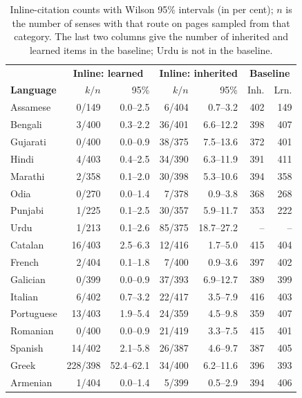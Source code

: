 \documentclass[11pt]{article}
\begin{document}
\begin{table}[h]
\centering\footnotesize
\setlength{\tabcolsep}{1.2pt}
\begin{tabular}{lrrrrrr}
\toprule
& \multicolumn{2}{c}{\textbf{Inline: learned}} & \multicolumn{2}{c}{\textbf{Inline: inherited}} & \multicolumn{2}{c}{\textbf{Baseline}} \\
\textbf{Language} & $k/n$ & 95\% & $k/n$ & 95\% & Inh. & Lrn. \\
\midrule
Assamese & 0/149 & 0.0--2.5 & 6/404 & 0.7--3.2 & 402 & 149 \\
Bengali & 3/400 & 0.3--2.2 & 36/401 & 6.6--12.2 & 398 & 407 \\
Gujarati & 0/400 & 0.0--0.9 & 38/375 & 7.5--13.6 & 372 & 401 \\
Hindi & 4/403 & 0.4--2.5 & 34/390 & 6.3--11.9 & 391 & 411 \\
Marathi & 2/358 & 0.1--2.0 & 30/398 & 5.3--10.6 & 394 & 358 \\
Odia & 0/270 & 0.0--1.4 & 7/378 & 0.9--3.8 & 368 & 268 \\
Punjabi & 1/225 & 0.1--2.5 & 30/357 & 5.9--11.7 & 353 & 222 \\
Urdu & 1/213 & 0.1--2.6 & 85/375 & 18.7--27.2 & -- & -- \\
\midrule
Catalan & 16/403 & 2.5--6.3 & 12/416 & 1.7--5.0 & 415 & 404 \\
French & 2/404 & 0.1--1.8 & 7/400 & 0.9--3.6 & 397 & 402 \\
Galician & 0/399 & 0.0--0.9 & 37/393 & 6.9--12.7 & 389 & 399 \\
Italian & 6/402 & 0.7--3.2 & 22/417 & 3.5--7.9 & 416 & 403 \\
Portuguese & 13/403 & 1.9--5.4 & 24/359 & 4.5--9.8 & 359 & 407 \\
Romanian & 0/400 & 0.0--0.9 & 21/419 & 3.3--7.5 & 415 & 401 \\
Spanish & 14/402 & 2.1--5.8 & 26/387 & 4.6--9.7 & 387 & 405 \\
\midrule
Greek & 228/398 & 52.4--62.1 & 34/400 & 6.2--11.6 & 396 & 393 \\
\midrule
Armenian & 1/404 & 0.0--1.4 & 5/399 & 0.5--2.9 & 394 & 406 \\
\bottomrule
\end{tabular}
\caption{Inline-citation counts with Wilson 95\% intervals (in per cent); $n$ is the number of senses with that route on pages sampled from that category. The last two columns give the number of inherited and learned items in the baseline; Urdu is not in the baseline.}
\label{tab:denominators}
\end{table}
\end{document}
